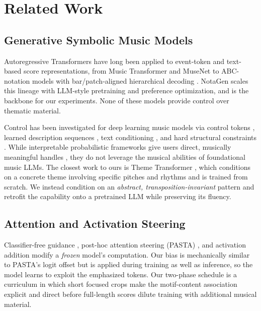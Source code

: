 \documentclass{article}
\begin{document}
\section{Related Work}
\label{sec:related}

\subsection*{Generative Symbolic Music Models}
Autoregressive Transformers have long been applied to event-token and text-based score representations, from Music Transformer \citep{huang2019music} and MuseNet \citep{payne2019musenet} to ABC-notation models with bar/patch-aligned hierarchical decoding \citep{wu2023tunesformer, qu2024mupt}. NotaGen \citep{wang2025notagen} scales this lineage with LLM-style pretraining and preference optimization, and is the backbone for our experiments. None of these models provide control over thematic material.


Control has been investigated for deep learning music models via control tokens \citep{keskar2019ctrl}, learned description sequences \citep{vonrutte2023figaro}, text conditioning \citep{lu2023musecoco}, and hard structural constraints \citep{herremans2017morpheus}. While interpretable probabilistic frameworks give users direct, musically meaningful handles \citet{hahn2023interpretable,hahn2024senthymnent, nihahn2025progress}, they do not leverage the musical abilities of foundational music LLMs. The closest work to ours is Theme Transformer \citep{shih2022theme}, which conditions on a concrete theme involving specific pitches and rhythms and is trained from scratch. We instead condition on an \emph{abstract, transposition-invariant} pattern and retrofit the capability onto a pretrained LLM while preserving its fluency.


\subsection*{Attention and Activation Steering}
Classifier-free guidance \citep{ho2022classifier}, post-hoc attention steering (PASTA) \citep{zhang2024pasta}, and activation addition \citep{turner2023activation} modify a \emph{frozen} model's computation. Our bias is mechanically similar to PASTA's logit offset but is applied during training as well as inference, so the model learns to exploit the emphasized tokens. Our two-phase schedule is a curriculum \citep{bengio2009curriculum} in which short focused crops make the motif-content association explicit and direct before full-length scores dilute training with additional musical material.
\end{document}
